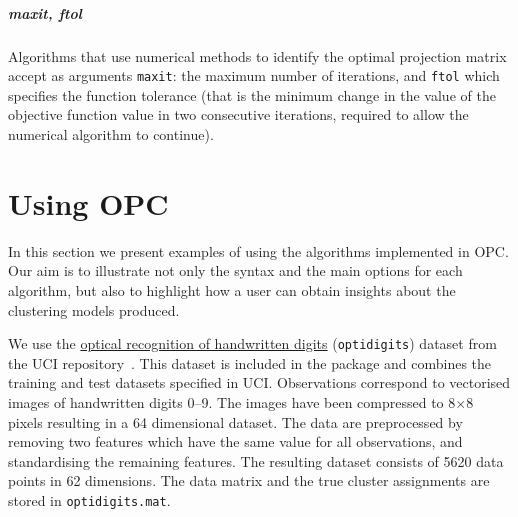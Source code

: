 \documentclass{book}
\begin{document}
\paragraph{maxit, ftol}
%
Algorithms that use numerical methods to identify the optimal projection matrix
accept as arguments {\tt maxit}: the maximum number of iterations,
and {\tt ftol} which specifies the function tolerance (that is
the minimum change in the value of the objective function
value in two consecutive iterations, required to allow the numerical
algorithm to continue).

%
%
%
%



\chapter{Using OPC}\label{sec:using}

In this section we present examples of using the algorithms
implemented in OPC. Our aim is to illustrate not only the syntax and the main options
for each algorithm, but also to highlight how a user can obtain insights about
the clustering models produced.

We use the \href{https://archive.ics.uci.edu/ml/datasets/optical+recognition+of+handwritten+digits}
{optical recognition of handwritten digits} ({\tt optidigits}) dataset
from the UCI repository~\cite{UCI}. This dataset is included in the package and
combines the training and test datasets specified in UCI. 
%
Observations correspond to
vectorised images of handwritten digits 0--9. The images have been compressed
to 8$\times$8 pixels resulting in a 64 dimensional dataset.
%
The data are preprocessed by removing two features which have the same value for all
observations, and standardising the remaining features. The resulting dataset consists of
5620 data points in 62 dimensions. The data matrix and the true cluster
assignments are stored in {\tt optidigits.mat}.
\end{document}

